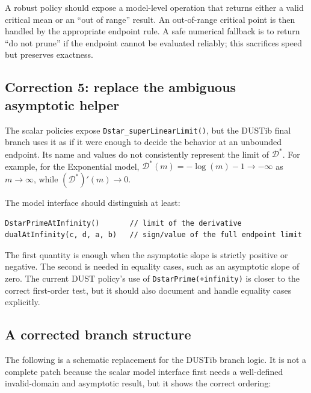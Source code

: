 \documentclass[11pt]{article}
\newcommand{\Dstar}{\mathcal{D}^*}
\begin{document}
A robust policy should expose a model-level operation that returns either a
valid critical mean or an ``out of range'' result.  An out-of-range critical
point is then handled by the appropriate endpoint rule.  A safe numerical
fallback is to return ``do not prune'' if the endpoint cannot be evaluated
reliably; this sacrifices speed but preserves exactness.

\subsection{Correction 5: replace the ambiguous asymptotic helper}

The scalar policies expose \texttt{Dstar\_superLinearLimit()}, but the
DUSTib final branch uses it as if it were enough to decide the behavior at an
unbounded endpoint.  Its name and values do not consistently represent the
limit of $\Dstar$.  For example, for the Exponential model,
$\Dstar(m)=-\log(m)-1\to-\infty$ as $m\to\infty$, while
$(\Dstar)'(m)\to0$.

The model interface should distinguish at least:

\begin{verbatim}
DstarPrimeAtInfinity()       // limit of the derivative
dualAtInfinity(c, d, a, b)   // sign/value of the full endpoint limit
\end{verbatim}

The first quantity is enough when the asymptotic slope is strictly positive
or negative.  The second is needed in equality cases, such as an asymptotic
slope of zero.  The current DUST policy's use of
\texttt{DstarPrime(+infinity)} is closer to the correct first-order test, but
it should also document and handle equality cases explicitly.

\subsection{A corrected branch structure}

The following is a schematic replacement for the DUSTib branch logic.  It is
not a complete patch because the scalar model interface first needs a
well-defined invalid-domain and asymptotic result, but it shows the correct
ordering:
\end{document}

